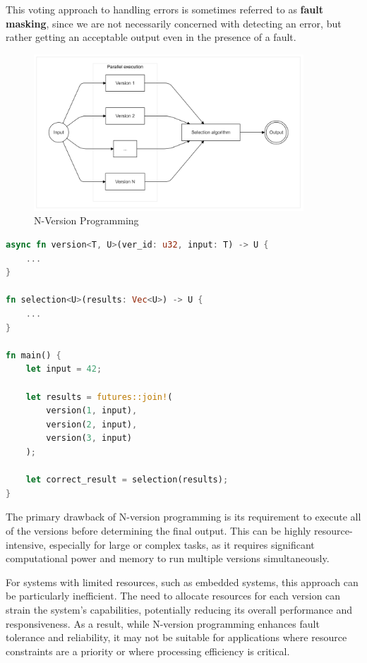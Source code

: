 \documentclass[12pt, letterpaper]{article}
\begin{document}
This voting approach to handling errors is sometimes referred to as \textbf{fault masking}, since we are not necessarily concerned with detecting an error, but rather getting an acceptable output even in the presence of a fault.

\begin{figure}[hbt!]
    \centering
    \includegraphics[width=0.9\textwidth]{n_version_prog/n_version_prog.png}
    \caption{N-Version Programming}
\end{figure}

\begin{lstlisting}[language=Rust]
async fn version<T, U>(ver_id: u32, input: T) -> U {
    ...
}

fn selection<U>(results: Vec<U>) -> U {
    ...
}

fn main() {
    let input = 42; 
    
    let results = futures::join!(
        version(1, input), 
        version(2, input), 
        version(3, input)
    );

    let correct_result = selection(results);
}
\end{lstlisting}

The primary drawback of N-version programming is its requirement to execute all of the versions before determining the final output. This can be highly resource-intensive, especially for large or complex tasks, as it requires significant computational power and memory to run multiple versions simultaneously.

For systems with limited resources, such as embedded systems, this approach can be particularly inefficient. The need to allocate resources for each version can strain the system's capabilities, potentially reducing its overall performance and responsiveness. As a result, while N-version programming enhances fault tolerance and reliability, it may not be suitable for applications where resource constraints are a priority or where processing efficiency is critical.
\end{document}
